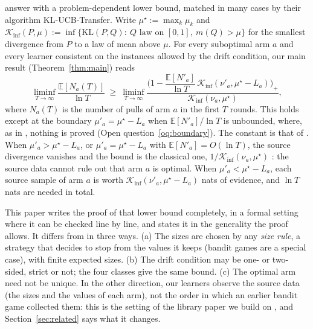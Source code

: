 \documentclass[11pt]{article}
\newcommand{\E}{\mathbb{E}}
\begin{document}
\citet[Theorem~2]{PMRM26} answer with a problem-dependent lower bound, matched in many cases by
their algorithm KL-UCB-Transfer. Write $\mu^\star:=\max_k\mu_k$ and
$\mathcal K_{\inf}(P,\mu):=\inf\{\mathrm{KL}(P,Q):\ Q\text{ law on }[0,1],\ m(Q)>\mu\}$ for the
smallest divergence from $P$ to a law of mean above $\mu$. For every suboptimal arm $a$ and every
learner consistent on the instances allowed by the drift condition, our main result
(Theorem~\ref{thm:main}) reads
\begin{equation}\label{eq:intro-bound}
\liminf_{T\to\infty}\frac{\E[N_a(T)]}{\ln T}\ \ge\
\liminf_{T\to\infty}\frac{\Big(1-\dfrac{\E[N'_a]}{\ln T}\,\mathcal K_{\inf}(\nu'_a,\mu^\star-L_a)\Big)_+}{\mathcal K_{\inf}(\nu_a,\mu^\star)},
\end{equation}
where $N_a(T)$ is the number of pulls of arm $a$ in the first $T$ rounds. This holds except at the
boundary $\mu'_a=\mu^\star-L_a$ when $\E[N'_a]/\ln T$ is unbounded, where, as in
\citet[Theorem~2]{PMRM26}, nothing is proved (Open question~\ref{oq:boundary}). The constant is that of
\citet[Theorem~2]{PMRM26}. When $\mu'_a>\mu^\star-L_a$, or $\mu'_a=\mu^\star-L_a$ with
$\E[N'_a]=O(\ln T)$, the source divergence vanishes and the bound is the classical one, $1/\mathcal K_{\inf}(\nu_a,\mu^\star)$ \citep{LR85,BK96}: the source data
cannot rule out that arm $a$ is optimal. When $\mu'_a<\mu^\star-L_a$, each source sample of arm $a$
is worth $\mathcal K_{\inf}(\nu'_a,\mu^\star-L_a)$ nats of evidence, and $\ln T$ nats are needed in
total.

This paper writes the proof of that lower bound completely, in a formal setting where it can be
checked line by line, and states it in the generality the proof allows. It differs from
\citet[Theorem~2]{PMRM26} in three ways. (a) The sizes are chosen by any \emph{size rule}, a
strategy that decides to stop from the values it keeps (bandit games are a special case), with
finite expected sizes. (b) The drift condition may be one- or two-sided, strict or not; the four
classes give the same bound. (c) The optimal arm need not be unique. In the other direction,
our learners observe the source data (the sizes and the values of each arm), not the order in which
an earlier bandit game collected them: this is the setting of the library paper we build on
\citep{INC-P003}, and Section~\ref{sec:related} says what it changes.
\end{document}
